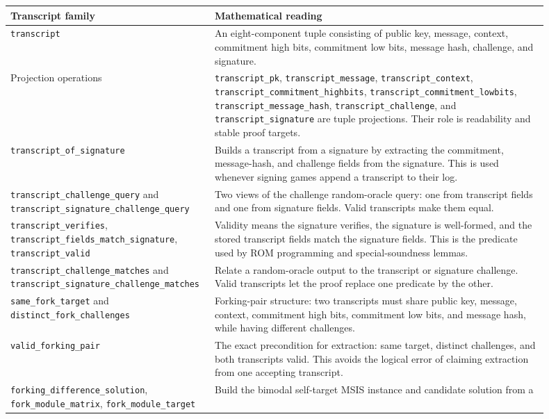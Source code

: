 \documentclass[11pt]{report}
\DeclareRobustCommand{\ec}[1]{\ifmmode\text{\nolinkurl{#1}}\else\nolinkurl{#1}\fi}
\theoremstyle{definition}
\theoremstyle{plain}
\begin{document}
\begin{longtable}{p{0.30\linewidth}p{0.60\linewidth}}
\toprule
\textbf{Transcript family} & \textbf{Mathematical reading} \\
\midrule
\ec{transcript} &
An eight-component tuple consisting of public key, message, context,
commitment high bits, commitment low bits, message hash, challenge, and
signature. \\
Projection operations &
\ec{transcript\_pk}, \ec{transcript\_message},
\ec{transcript\_context}, \ec{transcript\_commitment\_highbits},
\ec{transcript\_commitment\_lowbits}, \ec{transcript\_message\_hash},
\ec{transcript\_challenge}, and \ec{transcript\_signature} are tuple
projections.  Their role is readability and stable proof targets. \\
\ec{transcript\_of\_signature} &
Builds a transcript from a signature by extracting the commitment, message-hash,
and challenge fields from the signature.  This is used whenever signing games
append a transcript to their log. \\
\ec{transcript\_challenge\_query} and
\ec{transcript\_signature\_challenge\_query} &
Two views of the challenge random-oracle query: one from transcript fields and
one from signature fields.  Valid transcripts make them equal. \\
\ec{transcript\_verifies},
\ec{transcript\_fields\_match\_signature},
\ec{transcript\_valid} &
Validity means the signature verifies, the signature is well-formed, and the
stored transcript fields match the signature fields.  This is the predicate
used by ROM programming and special-soundness lemmas. \\
\ec{transcript\_challenge\_matches} and
\ec{transcript\_signature\_challenge\_matches} &
Relate a random-oracle output to the transcript or signature challenge.  Valid
transcripts let the proof replace one predicate by the other. \\
\ec{same\_fork\_target} and
\ec{distinct\_fork\_challenges} &
Forking-pair structure: two transcripts must share public key, message,
context, commitment high bits, commitment low bits, and message hash, while
having different challenges. \\
\ec{valid\_forking\_pair} &
The exact precondition for extraction: same target, distinct challenges, and
both transcripts valid.  This avoids the logical error of claiming extraction
from one accepting transcript. \\
\ec{forking\_difference\_solution},
\ec{fork\_module\_matrix},
\ec{fork\_module\_target} &
Build the bimodal self-target MSIS instance and candidate solution from a

\end{longtable}
\end{document}
